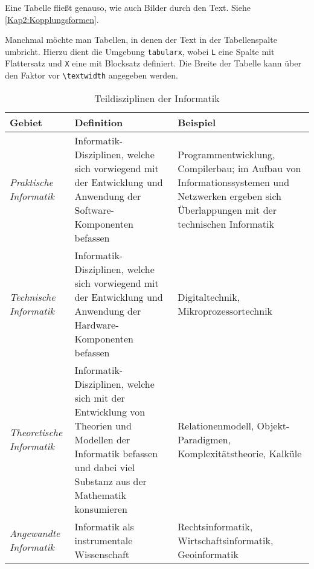 \begin{table}[ht]
  \caption{Ebenen der Kopplung und Beispiele für enge und lose Kopplung}
  \label{Kap2:Kopplungsformen}
  \renewcommand{\arraystretch}{1.2}
  \small
  \centering
\end{table}

Eine Tabelle fließt genauso, wie auch Bilder durch den Text. Siehe \autoref{Kap2:Kopplungsformen}.

Manchmal möchte man Tabellen, in denen der Text in der Tabellenspalte umbricht. Hierzu dient die Umgebung \texttt{tabularx}, wobei \texttt{L} eine Spalte mit Flattersatz und \texttt{X} eine mit Blocksatz definiert. Die Breite der Tabelle kann über den Faktor vor \verb+\textwidth+ angegeben werden.

\begin{table}[ht]
  \caption{Teildisziplinen der Informatik}
  \label{Kap2:Teildisziplinen}
  \renewcommand{\arraystretch}{1.2}
  \centering
  \small
    \begin{tabularx}{0.95\textwidth}{l X L}
      \toprule
      \textbf{Gebiet} & \textbf{Definition} & \textbf{Beispiel}\\
      \toprule
      \emph{Praktische Informatik} & Informatik-Disziplinen, welche sich vorwiegend mit der Entwicklung und Anwendung der Software-Komponenten befassen & Programmentwicklung, Compilerbau; im Aufbau von \zb{} Informationssystemen und Netzwerken ergeben sich Überlappungen mit der technischen Informatik \\\midrule
      \emph{Technische Informatik} & Informatik-Disziplinen, welche sich vorwiegend mit der Entwicklung und Anwendung der Hardware-Komponenten befassen & Digitaltechnik, Mikroprozessortechnik \\\midrule
      \emph{Theoretische Informatik} & Informatik-Disziplinen, welche sich mit der Entwicklung von Theorien und Modellen der Informatik befassen und dabei viel Substanz aus der Mathematik konsumieren & Relationenmodell, Objekt-Paradigmen, Komplexitätstheorie, Kalküle \\\midrule
      \emph{Angewandte Informatik} & Informatik als instrumentale Wissenschaft & Rechtsinformatik, Wirtschaftsinformatik, Geoinformatik \\
      \bottomrule
    \end{tabularx}
\end{table}

